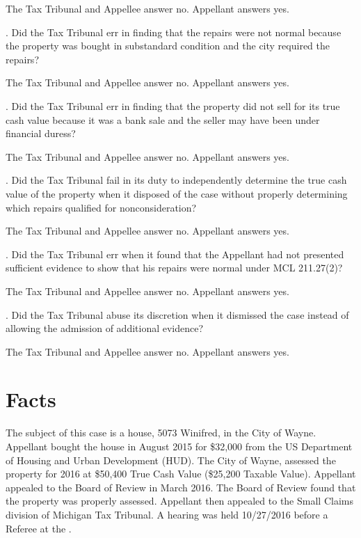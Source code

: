 \documentclass[12pt,\documentclassflag]{michiganCourtOfAppealsBrief}
\begin{document}
The Tax Tribunal and Appellee answer no. Appellant answers yes. 
\vspace{\baselineskip}

. Did the Tax Tribunal err in finding that the repairs were not normal because the property was bought in substandard condition  and the city required the repairs?

The Tax Tribunal and Appellee answer no. Appellant answers yes.
\vspace{\baselineskip}

. Did the Tax Tribunal err in finding that the property did not sell for its true cash value because it was a bank sale and the seller may have been under financial duress?

The Tax Tribunal and Appellee answer no. Appellant answers yes. 
\vspace{\baselineskip}

. Did the Tax Tribunal fail in its duty to independently determine the true cash value of the property when it disposed of the case without properly determining which repairs qualified for nonconsideration?

The Tax Tribunal and Appellee answer no. Appellant answers yes.
\vspace{\baselineskip}

. Did the Tax Tribunal err when it found that the Appellant had not presented sufficient evidence to show that his repairs were normal under MCL 211.27(2)?

The Tax Tribunal and Appellee answer no. Appellant answers yes.
\vspace{\baselineskip}

. Did the Tax Tribunal abuse its discretion when it dismissed the case instead of allowing the admission of additional evidence?

The Tax Tribunal and Appellee answer no. Appellant answers yes. 

\newpage 

\section{Facts}
The subject of this case is a house, 5073 Winifred, in the City of Wayne. Appellant bought the house in August 2015 for \$32,000 from the US Department of Housing and Urban Development (HUD). The City of Wayne, assessed the property for 2016 at \$50,400 True Cash Value (\$25,200 Taxable Value). Appellant appealed to the Board of Review in March 2016. The Board of Review found that the property was properly assessed. Appellant then appealed to the Small Claims division of Michigan Tax Tribunal. A hearing was held 10/27/2016 before a Referee at the \MTT.
\end{document}
